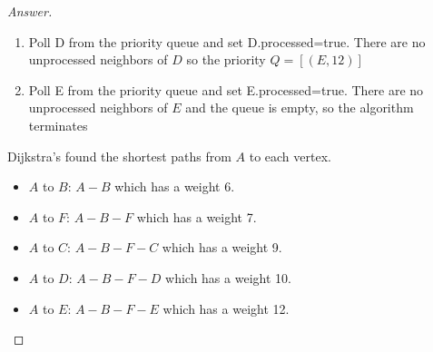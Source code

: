 \documentclass[11pt]{article}
\theoremstyle{definition}
\theoremstyle{definition}
\theoremstyle{definition}
\begin{document}
\begin{proof}[Answer]
\begin{enumerate}
\item Poll D from the priority queue and set D.processed=true. There are no unprocessed neighbors of $D$ so the priority $Q= [(E,12)]$
	
\item Poll E from the priority queue and set E.processed=true. There are no unprocessed neighbors of $E$ and the queue is empty, so the algorithm terminates\\
\end{enumerate}
 Dijkstra's found the shortest paths from $A$ to each vertex.
		\begin{itemize}
		\item $A$ to $B$: $A-B$ which has a weight 6. 
		\item $A$ to $F$: $A-B-F$ which has a weight 7. 
		\item $A$ to $C$: $A-B-F-C$ which has a weight 9. 
		\item $A$ to $D$: $A-B-F-D$ which has a weight 10. 
		\item $A$ to $E$: $A-B-F-E$ which has a weight 12. 
		\end{itemize}


\end{proof}




\end{document}
